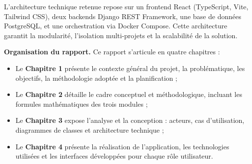 \noindent L'architecture technique retenue repose sur un frontend React (TypeScript, Vite, Tailwind CSS), deux backends Django REST Framework, une base de données PostgreSQL, et une orchestration via Docker Compose. Cette architecture garantit la modularité, l'isolation multi-projets et la scalabilité de la solution.

\vspace{0.3cm}
\noindent\textbf{Organisation du rapport.} Ce rapport s'articule en quatre chapitres :
\begin{itemize}
    \item Le \textbf{Chapitre 1} présente le contexte général du projet, la problématique, les objectifs, la méthodologie adoptée et la planification ;
    \item Le \textbf{Chapitre 2} détaille le cadre conceptuel et méthodologique, incluant les formules mathématiques des trois modules ;
    \item Le \textbf{Chapitre 3} expose l'analyse et la conception : acteurs, cas d'utilisation, diagrammes de classes et architecture technique ;
    \item Le \textbf{Chapitre 4} présente la réalisation de l'application, les technologies utilisées et les interfaces développées pour chaque rôle utilisateur.
\end{itemize}
